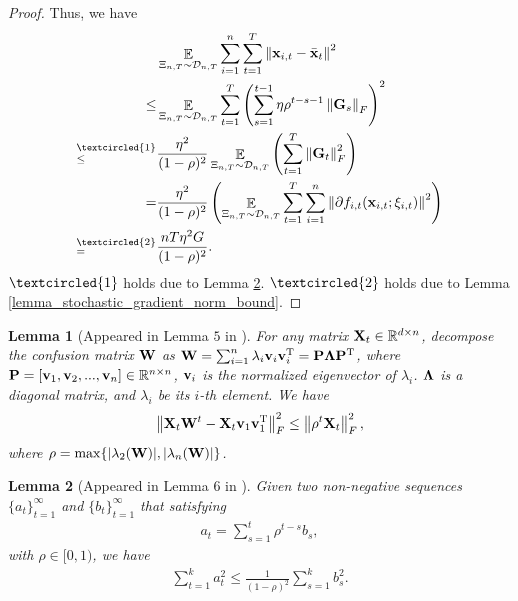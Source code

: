 \documentclass{article}
\newtheorem{Lemma}{\bf{Lemma}}
\begin{document}
\begin{proof}
Thus, we  have
\begin{align}
\nonumber
& \EE_{ \Xi_{n,T} \sim \Dcal_{n,T} } \sum_{i=1}^n\sum_{t=1}^T \lrnorm{\x_{i,t} - \bar{\x}_t}^2  \\ \nonumber 
\le & \EE_{ \Xi_{n,T} \sim \Dcal_{n,T} } \sum_{t=1}^T \lrincir{ \sum_{s=1}^{t-1} \eta \rho^{t-s-1} \lrnorm{\G_s}_F}^2  \\ \nonumber
\refabovecir{\le}{\textcircled{1}} & \frac{\eta^2}{(1-\rho)^2} \EE_{ \Xi_{n,T} \sim \Dcal_{n,T} } \lrincir{  \sum_{t=1}^T \lrnorm{\G_t}_F^2 } \\ \nonumber
= & \frac{\eta^2}{(1-\rho)^2} \lrincir{ \EE_{ \Xi_{n,T} \sim \Dcal_{n,T} } \sum_{t=1}^T \sum_{i=1}^n  \lrnorm{\partial f_{i,t}(\x_{i,t}; \xi_{i,t})}^2 } \\ \nonumber
\refabovecir{=}{\textcircled{2}} & \frac{nT\eta^2 G }{(1-\rho)^2}.
\end{align} $\textcircled{1}$ holds due to Lemma \ref{lemma_hanlin_2}.  $\textcircled{2}$ holds due to Lemma \ref{lemma_stochastic_gradient_norm_bound}.



\end{proof}








\begin{Lemma}[Appeared in Lemma $5$ in \citep{Tang:2018un}]
\label{lemma_hanlin_1}
For any matrix ${\bf X}_t\in\mathbb{R}^{d\times n}$, decompose the confusion matrix ${\bf W}$ as ${\bf W} = \sum_{i=1}^n \lambda_i {\bf v}_i {\bf v}_i^{\rm T} = {\bf P} \mathbf{\Lambda} {\bf P}^{\rm T}$, where ${\bf P} = [{\bf v}_1, {\bf v}_2, ..., {\bf v}_n]\in\mathbb{R}^{n\times n}$, ${\bf v}_i$ is the normalized eigenvector of $\lambda_i$. $\mathbf{\Lambda}$ is a diagonal matrix, and $\lambda_i$ be its $i$-th element. We have
\begin{align}
\nonumber
\left\lVert{\bf X}_t {\bf W}^t - {\bf X}_t {\bf v}_1 {\bf v}_1^{\rm T} \right\rVert_F^2 \le \left\lVert\rho^t {\bf X}_t\right\rVert_F^2, 
\end{align} where  $\rho = \max \{| \lambda_2({\bf W}) |, | \lambda_n({\bf W}) |\}$. 

\end{Lemma}


\begin{Lemma}[Appeared in Lemma $6$ in \citep{Tang:2018un}]
\label{lemma_hanlin_2}
Given two non-negative sequences $\{a_t\}_{t=1}^{\infty}$ and $\{b_t\}_{t=1}^{\infty}$ that satisfying
\begin{align}
\nonumber
a_t = \sum_{s=1}^t \rho^{t-s} b_s,
\end{align} with $\rho \in [0,1)$, we have
\begin{align}
\nonumber
\sum_{t=1}^k a_t^2 \le \frac{1}{(1-\rho)^2}\sum_{s=1}^k b_s^2.
\end{align}
\end{Lemma}


















\end{document}
